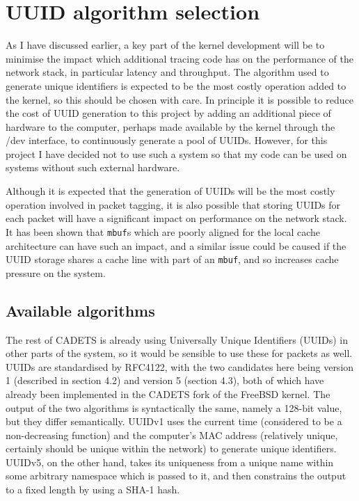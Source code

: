 \documentclass[a4paper,12pt,twoside,openright]{report}
\begin{document}
	\section{UUID algorithm selection}
	
	As I have discussed earlier, a key part of the kernel development will be to minimise the impact which additional tracing code has on the performance of the network stack, in particular latency and throughput. The algorithm used to generate unique identifiers is expected to be the most costly operation added to the kernel, so this should be chosen with care. In principle it is possible to reduce the cost of UUID generation to this project by adding an additional piece of hardware to the computer, perhaps made available by the kernel through the /dev interface, to continuously generate a pool of UUIDs. However, for this project I have decided not to use such a system so that my code can be used on systems without such external hardware.
	
	Although it is expected that the generation of UUIDs will be the most costly operation involved in packet tagging, it is also possible that storing UUIDs for each packet will have a significant impact on performance on the network stack. It has been shown that \verb|mbuf|s which are poorly aligned for the local cache architecture can have such an impact, and a similar issue could be caused if the UUID storage shares a cache line with part of an \verb|mbuf|, and so increases cache pressure on the system.
	
	\subsection{Available algorithms}
	
	The rest of CADETS is already using Universally Unique Identifiers (UUIDs) in other parts of the system, so it would be sensible to use these for packets as well. UUIDs are standardised by RFC4122\cite{RFC4122}, with the two candidates here being version 1 (described in section 4.2) and version 5 (section 4.3), both of which have already been implemented in the CADETS fork of the FreeBSD kernel. The output of the two algorithms is syntactically the same, namely a 128-bit value, but they differ semantically. UUIDv1 uses the current time (considered to be a non-decreasing function) and the computer's MAC address (relatively unique, certainly should be unique within the network) to generate unique identifiers. UUIDv5, on the other hand, takes its uniqueness from a unique name within some arbitrary namespace which is passed to it, and then constrains the output to a fixed length by using a SHA-1 hash.
	
\end{document}
